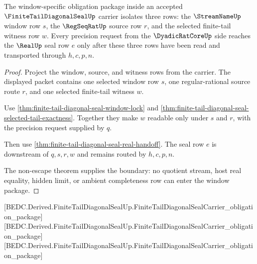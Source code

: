 \begin{theorem}
\label{thm:finitetaildiagonalseal-window-obligation-package}
The window-specific obligation package inside an accepted $\FiniteTailDiagonalSealUp$ carrier isolates three rows: the $\StreamNameUp$ window row $s$, the $\RegSeqRatUp$ source row $r$, and the selected finite-tail witness row $w$. Every precision request from the $\DyadicRatCoreUp$ side reaches the $\RealUp$ seal row $e$ only after these three rows have been read and transported through $h,c,p,n$.
\end{theorem}
\begin{proof}
Project the window, source, and witness rows from the carrier. The displayed packet contains one selected window row $s$, one regular-rational source route $r$, and one selected finite-tail witness $w$.

Use \autoref{thm:finite-tail-diagonal-seal-window-lock} and \autoref{thm:finite-tail-diagonal-seal-selected-tail-exactness}. Together they make $w$ readable only under $s$ and $r$, with the precision request supplied by $q$.

Then use \autoref{thm:finite-tail-diagonal-seal-real-handoff}. The seal row $e$ is downstream of $q,s,r,w$ and remains routed by $h,c,p,n$.

The non-escape theorem supplies the boundary: no quotient stream, host real equality, hidden limit, or ambient completeness row can enter the window package.
\end{proof}

[BEDC.Derived.FiniteTailDiagonalSealUp.FiniteTailDiagonalSealCarrier\_obligation\_package]
[BEDC.Derived.FiniteTailDiagonalSealUp.FiniteTailDiagonalSealCarrier\_obligation\_package]
[BEDC.Derived.FiniteTailDiagonalSealUp.FiniteTailDiagonalSealCarrier\_obligation\_package]

